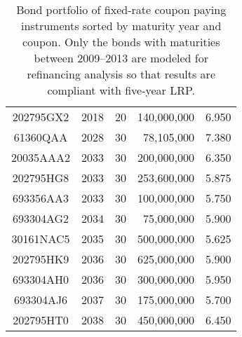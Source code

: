 \begin{table}[htbp]
\begin{tabular}{crrrr}
202795GX2 &	2018 &	20 &	140,000,000	& 6.950 \\
61360QAA  &	2028 &	30 &	78,105,000	& 7.380 \\
20035AAA2 &	2033 &	30 &	200,000,000	& 6.350 \\
202795HG8 &	2033 &	30 &	253,600,000	& 5.875 \\
693356AA3 &	2033 &	30 &	100,000,000	& 5.750 \\
693304AG2 &	2034 &	30 &	75,000,000	& 5.900 \\
30161NAC5 &	2035 &	30 &	500,000,000	& 5.625 \\
202795HK9 &	2036 &	30 &	625,000,000	& 5.900 \\
693304AH0 &	2036 &	30 &	300,000,000	& 5.950 \\
693304AJ6 &	2037 &	30 &	175,000,000	& 5.700 \\
202795HT0 &	2038 &	30 &	450,000,000	& 6.450 \\
	\bottomrule
	\end{tabular}
	\caption{Bond portfolio of fixed-rate coupon paying instruments sorted by maturity year and coupon. Only the bonds with maturities between 2009--2013 are modeled for refinancing analysis so that results are compliant with five-year LRP.}
	\label{tab:debt_portfolio}
\end{table}


